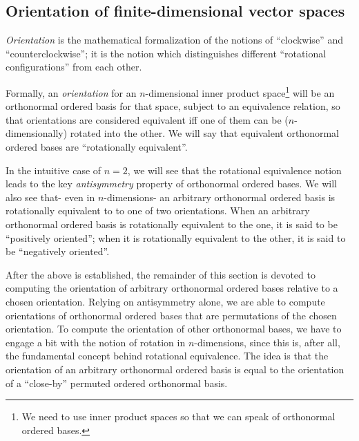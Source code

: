 \newpage

\subsection*{Orientation of finite-dimensional vector spaces}
\label{ch::lin_alg::section::orientation}

\textit{Orientation} is the mathematical formalization of the notions of ``clockwise'' and ``counterclockwise''; it is the notion which distinguishes different ``rotational configurations'' from each other.

Formally, an \textit{orientation} for an $n$-dimensional inner product space\footnote{We need to use inner product spaces so that we can speak of orthonormal ordered bases.} will be an orthonormal ordered basis for that space, subject to an equivalence relation, so that orientations are considered equivalent iff one of them can be ($n$-dimensionally) rotated into the other. We will say that equivalent orthonormal ordered bases are ``rotationally equivalent''.

In the intuitive case of $n = 2$, we will see that the rotational equivalence notion leads to the key \textit{antisymmetry} property of orthonormal ordered bases. We will also see that- even in $n$-dimensions- an arbitrary orthonormal ordered basis is rotationally equivalent to to one of two orientations. When an arbitrary orthonormal ordered basis is rotationally equivalent to the one, it is said to be ``positively oriented''; when it is rotationally equivalent to the other, it is said to be ``negatively oriented''.

After the above is established, the remainder of this section is devoted to computing the orientation of arbitrary orthonormal ordered bases relative to a chosen orientation. Relying on antisymmetry alone, we are able to compute orientations of orthonormal ordered bases that are permutations of the chosen orientation. To compute the orientation of other orthonormal bases, we have to engage a bit with the notion of rotation in $n$-dimensions, since this is, after all, the fundamental concept behind rotational equivalence. The idea is that the orientation of an arbitrary orthonormal ordered basis is equal to the orientation of a ``close-by'' permuted ordered orthonormal basis.

